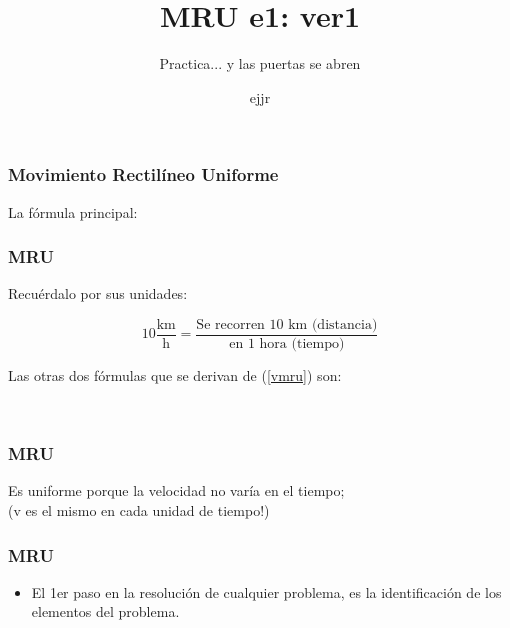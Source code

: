 \documentclass{beamer}
\title{MRU e1: ver1}
\subtitle{Practica... y las puertas se abren}
\author{ejjr}
\begin{document}
\maketitle


\begin{frame}
\frametitle{Movimiento Rectil\'ineo Uniforme}
La f\'ormula principal:

{\huge \vmru}

\vNUa
\end{frame}

\begin{frame}
\frametitle{MRU}
Recu\'erdalo por sus unidades:

\begin{equation*}
10\frac{\text{km}}{\text{h}} =
\frac{\text{Se recorren 10 km ({distancia})}}
{\text{en 1 hora ({tiempo})}}
\end{equation*}

Las otras dos f\'ormulas que se derivan de (\ref{vmru}) son:

{\large \xmru \\ \tmru}
\end{frame}

\begin{frame}
\frametitle{MRU}
Es uniforme porque la velocidad no var\'ia en el tiempo; \\
(v es el mismo en cada unidad de tiempo!)

\begin{center}
\end{center}
\end{frame}

\begin{frame}
\frametitle{MRU}


\begin{itemize}
\item El 1er paso en la resoluci\'on de cualquier problema, es la
identificaci\'on de los elementos del problema.
\end{itemize}


\end{frame}
\end{document}

